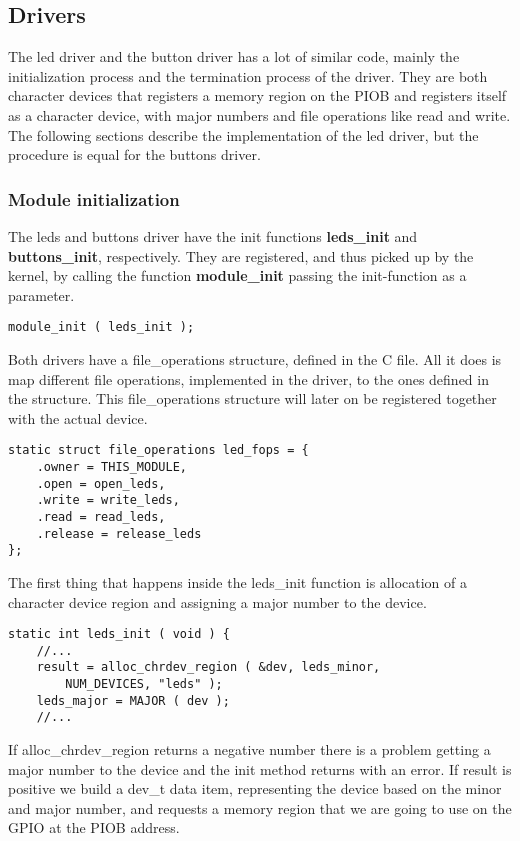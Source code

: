 \subsection{Drivers}
The led driver and the button driver has a lot of similar code, mainly 
the initialization process and the termination process of the driver. 
They are both character devices that registers a memory region on the 
PIOB and registers itself as a character device, with major numbers and 
file operations like read and write. The following sections 
describe the implementation of the led driver, but the procedure is equal for the buttons driver.

\subsubsection{Module initialization}
The leds and buttons driver have the init functions \textbf{leds\_init}
and \textbf{buttons\_init}, respectively. They are registered, and thus 
picked up by the kernel, by calling the function \textbf{module\_init}
passing the init-function as a parameter.
\\
\begin{lstlisting}
module_init ( leds_init );
\end{lstlisting}
Both drivers have a file\_operations structure,
defined in the C file. All it does is map different file operations,
implemented in the driver, to the ones defined in the structure.
This file\_operations structure will later on be registered together
with the actual device.
\\
\begin{lstlisting}
static struct file_operations led_fops = {
	.owner = THIS_MODULE,
	.open = open_leds,
	.write = write_leds,
	.read = read_leds,
	.release = release_leds
};
\end{lstlisting}
The first thing that happens inside the leds\_init function
is allocation of a character device region
and assigning a major number to the device.
\\
\begin{lstlisting}
static int leds_init ( void ) {
	//...
	result = alloc_chrdev_region ( &dev, leds_minor, 
		NUM_DEVICES, "leds" );
	leds_major = MAJOR ( dev );
	//...
\end{lstlisting}
If alloc\_chrdev\_region returns a negative number there is a problem getting
a major number to the device and the init method returns with an error.
If result is positive we build a dev\_t data item, 
representing the device based on the minor and major number, and requests a memory region that we are going to use on the GPIO at the PIOB address.
